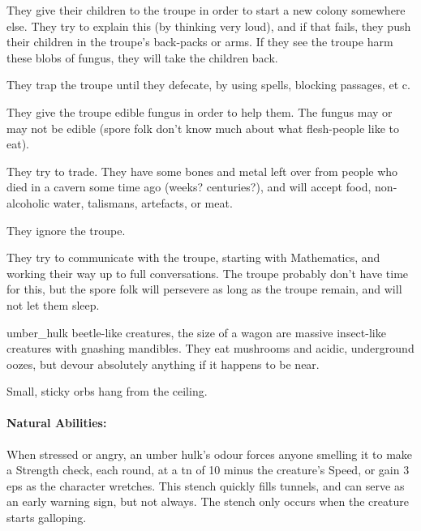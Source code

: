\begin{multicols}{2}

\begin{dlist}
  \item
  They give their children to the troupe in order to start a new colony somewhere else.
  They try to explain this (by thinking very loud), and if that fails, they push their children in the troupe's back-packs or arms.
  If they see the troupe harm these blobs of fungus, they will take the children back.
  \item
  They trap the troupe until they defecate, by using spells, blocking passages, et c.
  \item
  They give the troupe edible fungus in order to help them.
  The fungus may or may not be edible (spore folk don't know much about what flesh-people like to eat).
  \item
  They try to trade.
  They have some bones and metal left over from people who died in a cavern some time ago (weeks? centuries?), and will accept food, non-alcoholic water, \glspl{talisman}, \glspl{artefact}, or meat.
  \item
  They ignore the troupe.
  \item
  They try to communicate with the troupe, starting with Mathematics, and working their way up to full conversations.
  The troupe probably don't have time for this, but the spore folk will persevere as long as the troupe remain, and will not let them sleep.
\end{dlist}

\sporeFolk

\sporeFolk

\sporeFolk

  {umber_hulk}%
  {beetle-like creatures, the size of a wagon}%
are massive insect-like creatures with gnashing mandibles.
They eat mushrooms and acidic, underground oozes, but devour absolutely anything if it happens to be near.

\begin{boxtext}
  Small, sticky orbs hang from the ceiling.
\end{boxtext}

\paragraph{Natural Abilities:} When stressed or angry, an umber hulk's odour forces anyone smelling it to make a Strength check, each round, at a \gls{tn} of 10 minus the creature's Speed, or gain 3 \glspl{ep} as the character wretches.
This stench quickly fills tunnels, and can serve as an early warning sign, but not always.
The stench only occurs when the creature starts galloping.


\end{multicols}
